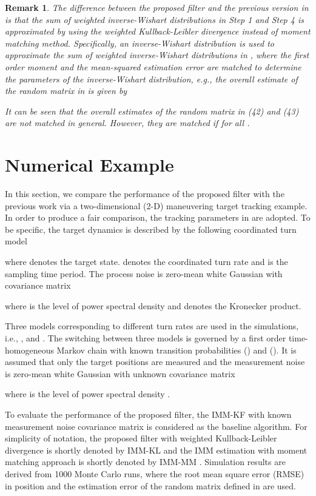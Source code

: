 \documentclass[12pt,draftcls,onecolumn]{IEEEtran}
\newtheorem{remark}{Remark}
\begin{document}
\begin{remark}
The difference between the proposed filter and the previous version
in \cite{ourwork2} is that the sum of weighted inverse-Wishart
distributions in \emph{Step 1} and \emph{Step 4} is approximated by
using the weighted Kullback-Leibler divergence instead of moment
matching method. Specifically, an inverse-Wishart distribution is
used to approximate the sum of weighted inverse-Wishart
distributions in \cite{ourwork2}, where the first order moment and
the mean-squared estimation error are matched to determine the
parameters of the inverse-Wishart distribution, e.g., the overall
estimate of the random matrix in \cite{ourwork2} is given by

It can be seen that the overall estimates of the random matrix in
(42) and (43) are not matched in general. However, they are matched
if  for all .
\end{remark}


\section{Numerical Example}


In this section, we compare the performance of the proposed filter
with the previous work via a two-dimensional (2-D) maneuvering
target tracking example. In order to produce a fair comparison, the
tracking parameters in \cite{ourwork2} are adopted. To be specific,
the target dynamics is described by the following coordinated turn
model

where  denotes the target
state.  denotes the coordinated turn rate and  is the
sampling time period. The process noise  is zero-mean white
Gaussian with covariance matrix

where  is the level of power spectral density and 
denotes the Kronecker product.


Three models corresponding to different turn rates are used in the
simulations, i.e., , 
and . The switching between three models is
governed by a first order time-homogeneous Markov chain with known
transition probabilities  () and
 (). It is assumed that only the target
positions are measured and the measurement noise is zero-mean white
Gaussian with unknown covariance matrix

where  is the level of power spectral density .



To evaluate the performance of the proposed filter, the IMM-KF with
known measurement noise covariance matrix is considered as the
baseline algorithm. For simplicity of notation, the proposed filter
with weighted Kullback-Leibler divergence is shortly denoted by
IMM-KL and the IMM estimation with moment matching approach is
shortly denoted by IMM-MM \cite{ourwork2}. Simulation results are
derived from 1000 Monte Carlo runs, where the root mean square error
(RMSE) in position and the estimation error of the random matrix
 defined in \cite{2012vbrtttsp} are used.
\end{document}
